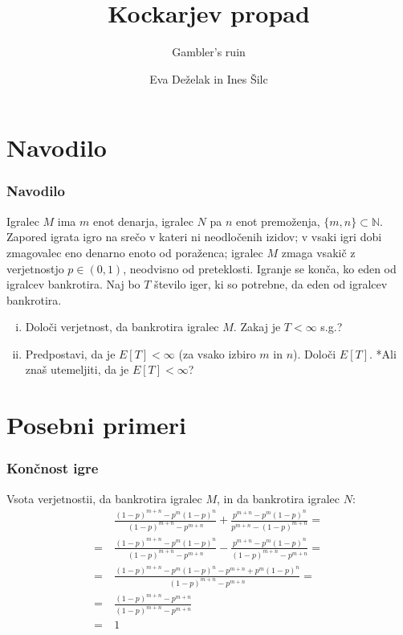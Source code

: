 \documentclass[10pt]{beamer}
\begin{document}
\title[Kockarjev propad ]{Kockarjev propad}
\subtitle{Gambler's ruin}
\author{Eva Deželak in Ines Šilc}

\begin{frame}
	\titlepage
\end {frame}
\section[Navodilo]{Navodilo}
\begin{frame}
\frametitle{Navodilo}
Igralec $M$ ima $m$ enot denarja, igralec $N$ pa $n$ enot premoženja, $\{m,n\}\subset \mathbb{N}$. Zapored igrata igro na srečo v kateri ni neodločenih izidov; v vsaki igri dobi zmagovalec eno denarno enoto od poraženca; igralec $M$ zmaga vsakič z verjetnostjo $p\in (0,1)$, neodvisno od preteklosti. Igranje se konča, ko eden od igralcev bankrotira. Naj bo $T$ število iger, ki so potrebne, da eden od igralcev bankrotira. 
\begin{enumerate}[(i)]
\item Določi verjetnost, da bankrotira igralec $M$. Zakaj je  $T<\infty$ s.g.?
\item Predpostavi, da je $E[T]<\infty$ (za vsako izbiro $m$ in $n$). Določi $E[T]$. *Ali znaš utemeljiti, da je $E[T]<\infty$?
\end{enumerate}

\end{frame}


\section[Posebni primeri]{Posebni primeri}
\begin{frame}
\frametitle{Končnost igre}
Vsota verjetnostii, da bankrotira igralec $M$, in da bankrotira igralec $N$:\\
\begin{equation*}
\begin{split}
&~\frac{(1-p)^{m+n}-p^m (1-p)^n}{(1-p)^{m+n}-p^{m+n}}+\frac{p^{m+n}-p^m
   (1-p)^n}{p^{m+n}-(1-p)^{m+n}} =\\
= &~\frac{(1-p)^{m+n}-p^m (1-p)^n}{(1-p)^{m+n}-p^{m+n}}-\frac{p^{m+n}-p^m
   (1-p)^n}{(1-p)^{m+n}-p^{m+n}} =\\
= &~\frac{(1-p)^{m+n}-p^m (1-p)^n-p^{m+n}+p^m
   (1-p)^n}{(1-p)^{m+n}-p^{m+n}} =\\
= &~\frac{(1-p)^{m+n}-p^{m+n}}{(1-p)^{m+n}-p^{m+n}} \\
= &~1
\end{split} 
\end{equation*}

\end{frame}
\end{document}
